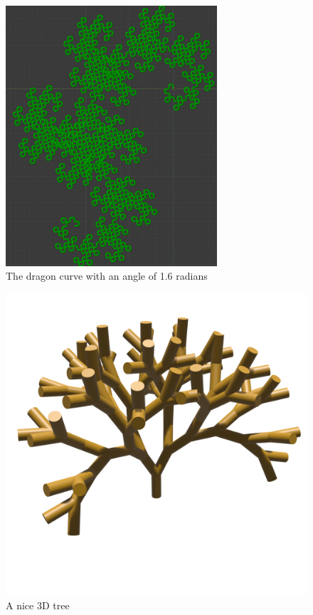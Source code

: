 \begin{figure}[H]
    \centering
    \includegraphics[width=0.7\textwidth]{figures/L-systems/dragon-1_6rad.png}
    \caption{The dragon curve with an angle of 1.6 radians}
\end{figure}

\begin{figure}[H]
    \centering
    \includegraphics[width=\textwidth]{figures/L-systems/tree1.png}
    \caption{A nice 3D tree}
\end{figure}

